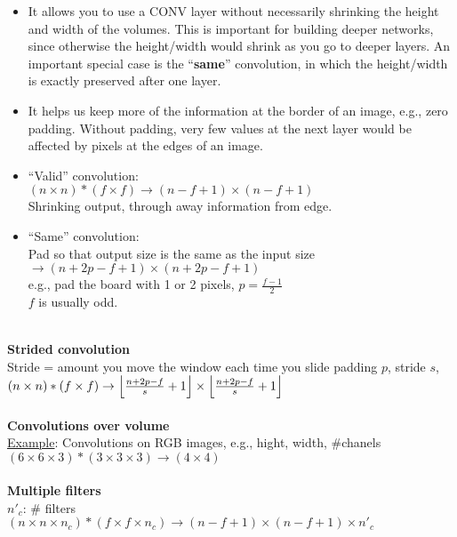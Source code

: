 \begin{itemize}
\item
It allows you to use a CONV layer without necessarily shrinking the height and width of the volumes. This is important for building deeper networks, since otherwise the height/width would shrink as you go to deeper layers. An important special case is the ``\textbf{same}'' convolution, in which the height/width is exactly preserved after one layer.
\item
It helps us keep more of the information at the border of an image, e.g., zero padding. Without padding, very few values at the next layer would be affected by pixels at the edges of an image.
\end{itemize}

\begin{itemize}
\item
``Valid'' convolution:\\
$(n \times n)  * (f \times f) \rightarrow (n-f+1) \times (n-f+1)$\\
Shrinking output, through away information from edge.
\item
``Same'' convolution:\\
Pad so that output size is the same as the input size
\\
$\rightarrow (n+2p-f+1) \times (n+2p-f+1)$\\
e.g., pad the board with 1 or 2 pixels, $p = \frac{f-1}{2}$\\
$f$ is usually odd.
\end{itemize}
~\\
\textbf{Strided convolution}\\
Stride = amount you move the window each time you slide
padding $p$, stride $s$,\\
$(n \times n)  * (f \times f) \rightarrow \Bigl \lfloor \frac{n+2p-f}{s} + 1 \Bigr \rfloor \times \Bigl \lfloor \frac{n+2p-f}{s} + 1 \Bigr \rfloor$\\
\\
\textbf{Convolutions over volume}\\
\underline{Example}: Convolutions on RGB images, e.g., hight, width, \#chanels\\
$(6 \times 6 \times 3) * (3 \times 3 \times 3) \rightarrow (4 \times 4)$\\
\\
\textbf{Multiple filters}\\
$n'_c$: \# filters\\
$(n \times n \times n_c) * (f \times f \times n_c) \rightarrow (n-f+1) \times (n-f+1) \times n'_c $

